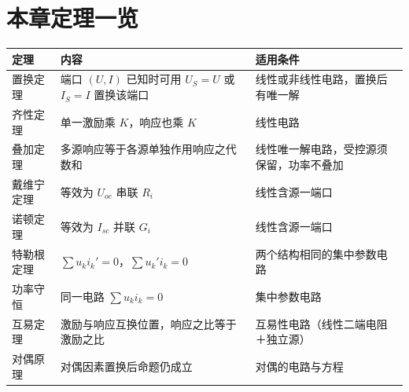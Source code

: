 \section*{本章定理一览}
\begin{center}
\begin{tabular}{@{}p{}p{}p{}@{}}
\toprule
定理 & 内容 & 适用条件 \\
\midrule
置换定理 & 端口 $(U,I)$ 已知时可用 $U_S=U$ 或 $I_S=I$ 置换该端口 & 线性或非线性电路，置换后有唯一解 \\
齐性定理 & 单一激励乘 $K$，响应也乘 $K$ & 线性电路 \\
叠加定理 & 多源响应等于各源单独作用响应之代数和 & 线性唯一解电路，受控源须保留，功率不叠加 \\
戴维宁定理 & 等效为 $U_{oc}$ 串联 $R_i$ & 线性含源一端口 \\
诺顿定理 & 等效为 $I_{sc}$ 并联 $G_i$ & 线性含源一端口 \\
特勒根定理 & $\sum u_ki_k'=0$，$\sum u_k'i_k=0$ & 两个结构相同的集中参数电路 \\
功率守恒 & 同一电路 $\sum u_ki_k=0$ & 集中参数电路 \\
互易定理 & 激励与响应互换位置，响应之比等于激励之比 & 互易性电路（线性二端电阻＋独立源） \\
对偶原理 & 对偶因素置换后命题仍成立 & 对偶的电路与方程 \\
\bottomrule
\end{tabular}
\end{center}

\endinput
